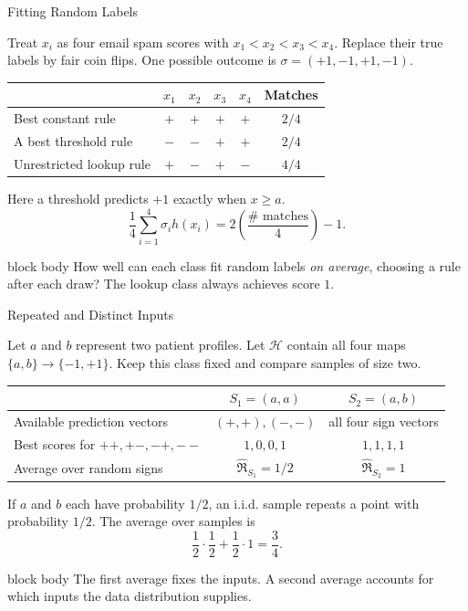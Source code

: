 \documentclass[aspectratio=169,10pt]{beamer}
\newcommand{\Hc}{\mathcal{H}}
\newcommand{\Rad}{\mathfrak{R}}
\newcommand{\pmone}{\{-1,+1\}}
\newcommand{\KeyBox}[1]{%
  \begin{beamercolorbox}[rounded=true,sep=0.22cm,wd=\linewidth]{block body}
    #1
  \end{beamercolorbox}%
}
\begin{document}
\begin{frame}[t]{Fitting Random Labels}
  \vspace{0.04cm}
  \small

  Treat $x_i$ as four email spam scores with $x_1<x_2<x_3<x_4$.
  Replace their true labels by fair coin flips.
  One possible outcome is $\sigma=(+1,-1,+1,-1)$.
  \begin{center}
  \renewcommand{\arraystretch}{1.15}
  \begin{tabular}{lcccc c}
    \toprule
    & $x_1$ & $x_2$ & $x_3$ & $x_4$ & Matches\\
    \midrule
    Best constant rule & $+$ & $+$ & $+$ & $+$ & $2/4$\\
    A best threshold rule & $-$ & $-$ & $+$ & $+$ & $2/4$\\
    Unrestricted lookup rule & $+$ & $-$ & $+$ & $-$ & $4/4$\\
    \bottomrule
  \end{tabular}
  \end{center}
  Here a threshold predicts $+1$ exactly when $x\ge a$.
  \[
    \frac14\sum_{i=1}^4\sigma_i h(x_i)
      =2\left(\frac{\#\text{ matches}}4\right)-1.
  \]
  \KeyBox{How well can each class fit random labels \emph{on average}, choosing
  a rule after each draw? The lookup class always achieves score $1$.}

\end{frame}

\begin{frame}[t]{Repeated and Distinct Inputs}
  \vspace{0.04cm}
  \small

  Let $a$ and $b$ represent two patient profiles. Let $\Hc$ contain all
  four maps $\{a,b\}\to\pmone$.
  Keep this class fixed and compare samples of size two.
  \begin{center}
  \renewcommand{\arraystretch}{1.15}
  \begin{tabular}{lcc}
    \toprule
    & $S_1=(a,a)$ & $S_2=(a,b)$\\
    \midrule
    Available prediction vectors & $(+,+),(-,-)$ & all four sign vectors\\
    Best scores for $++,+-,-+,--$ & $1,0,0,1$ & $1,1,1,1$\\
    Average over random signs & $\widehat{\Rad}_{S_1}=1/2$ & $\widehat{\Rad}_{S_2}=1$\\
    \bottomrule
  \end{tabular}
  \end{center}
  If $a$ and $b$ each have probability $1/2$, an i.i.d. sample repeats a
  point with probability $1/2$. The average over samples is
  \[
    \frac12\cdot\frac12+\frac12\cdot1=\frac34.
  \]
  \KeyBox{The first average fixes the inputs. A second average accounts for
  which inputs the data distribution supplies.}

\end{frame}
\end{document}
